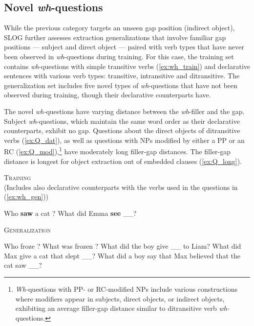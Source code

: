 \subsection{Novel \textit{wh}-questions} \label{subsec:cat_Q}

While the previous category targets an unseen gap position (indirect object), SLOG further assesses extraction generalizations that involve familiar gap positions --- subject and direct object --- paired with verb types that have never been observed in \textit{wh}-questions during training. For this case, the training set contains \textit{wh}-questions with simple transitive verbs (\ref{ex:wh_train}) and declarative sentences with various verb types: transitive, intransitive and ditransitive. The generalization set includes five novel types of \textit{wh}-questions that have not been observed during training, though their declarative counterparts have. 
 
The novel \textit{wh-}questions have varying distance between the \textit{wh}-filler and the gap. Subject \textit{wh}-questions, which maintain the same word order as their declarative counterparts, exhibit no gap. Questions about the direct objects of ditransitive verbs (\ref{ex:Q_dat}), as well as questions with NPs modified by either a PP or an RC (\ref{ex:Q_mod}),\footnote{\textit{Wh-}questions with PP- or RC-modified NPs include various constructions where modifiers appear in subjects, direct objects, or indirect objects, exhibiting an average filler-gap distance similar to ditransitive verb \textit{wh-}questions.} have moderately long filler-gap distances. %
The filler-gap distance is longest for object extraction out of embedded clauses (\ref{ex:Q_long}).
 
  


\begin{exe}
\ex \label{ex:wh_train} \textsc{Training}\\
(Includes also declarative counterparts with the verbs used in the questions in (\ref{ex:wh_gen}))
\begin{xlist}
  \ex \label{ex:wh_subj} Who \textbf{saw} a cat ? 
  \ex \label{ex:wh_dobj} What did Emma \textbf{see} \_\_?  
\end{xlist}
\ex \label{ex:wh_gen} \textsc{Generalization} 
\begin{xlist}
\ex \label{ex:Q_active} Who froze ? 
\ex \label{ex:Q_pass} What was frozen ?
\ex \label{ex:Q_dat} What did the boy give \_\_ to Liam?
\ex \label{ex:Q_mod} What did Max give a cat that slept \_\_?
\ex \label{ex:Q_long} What did a boy say that Max believed that the cat saw \_\_?
\end{xlist}
\end{exe}

